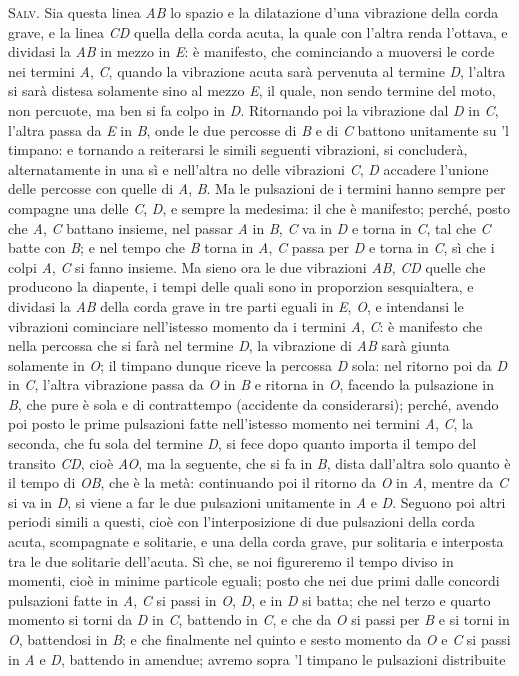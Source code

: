 \documentclass[11pt,twoside,openany]{book}
\newcommand{\speaker}[1]{\textcolor{rubric}{\textsc{#1}}\space}
\begin{document}
\speaker{Salv.} Sia questa linea \emph{AB} lo spazio e la dilatazione d'una vibrazione della corda grave, e la linea \emph{CD} quella della corda acuta, la quale con l'altra renda l'ottava, e dividasi la \emph{AB} in mezzo in \emph{E}: è manifesto, che cominciando a muoversi le corde nei termini \emph{A}, \emph{C}, quando la vibrazione acuta sarà pervenuta al termine \emph{D}, l'altra si sarà distesa solamente sino al mezzo \emph{E}, il quale, non sendo termine del moto, non percuote, ma ben si fa colpo in \emph{D}. Ritornando poi la vibrazione dal \emph{D} in \emph{C}, l'altra passa da \emph{E} in \emph{B}, onde le due percosse di \emph{B} e di \emph{C} battono unitamente su 'l timpano: e tornando a reiterarsi le simili seguenti vibrazioni, si concluderà, alternatamente in una sì e nell'altra no delle vibrazioni \emph{C}, \emph{D} accadere l'unione delle percosse con quelle di \emph{A}, \emph{B}. Ma le pulsazioni de i termini hanno sempre per compagne una delle \emph{C}, \emph{D}, e sempre la medesima: il che è manifesto; perché, posto che \emph{A}, \emph{C} battano insieme, nel passar \emph{A} in \emph{B}, \emph{C} va in \emph{D} e torna in \emph{C}, tal che \emph{C} batte con \emph{B}; e nel tempo che \emph{B} torna in \emph{A}, \emph{C} passa per \emph{D} e torna in \emph{C}, sì che i colpi \emph{A}, \emph{C} si fanno insieme. Ma sieno ora le due vibrazioni \emph{AB}, \emph{CD} quelle che producono la diapente, i tempi delle quali sono in proporzion sesquialtera, e dividasi la \emph{AB} della corda grave in tre parti eguali in \emph{E}, \emph{O}, e intendansi le vibrazioni cominciare nell'istesso momento da i termini \emph{A}, \emph{C}: è manifesto che nella percossa che si farà nel termine \emph{D}, la vibrazione di \emph{AB} sarà giunta solamente in \emph{O}; il timpano dunque riceve la percossa \emph{D} sola: nel ritorno poi da \emph{D} in \emph{C}, l'altra vibrazione passa da \emph{O} in \emph{B} e ritorna in \emph{O}, facendo la pulsazione in \emph{B}, che pure è sola e di contrattempo (accidente da considerarsi); perché, avendo poi posto le prime pulsazioni fatte nell'istesso momento nei termini \emph{A}, \emph{C}, la seconda, che fu sola del termine \emph{D}, si fece dopo quanto importa il tempo del transito \emph{CD}, cioè \emph{AO}, ma la seguente, che si fa in \emph{B}, dista dall'altra solo quanto è il tempo di \emph{OB}, che è la metà: continuando poi il ritorno da \emph{O} in \emph{A}, mentre da \emph{C} si va in \emph{D}, si viene a far le due pulsazioni unitamente in \emph{A} e \emph{D}. Seguono poi altri periodi simili a questi, cioè con l'interposizione di due pulsazioni della corda acuta, scompagnate e solitarie, e una della corda grave, pur solitaria e interposta tra le due solitarie dell'acuta. Sì che, se noi figureremo il tempo diviso in momenti, cioè in minime particole eguali; posto che nei due primi dalle concordi pulsazioni fatte in \emph{A}, \emph{C} si passi in \emph{O}, \emph{D}, e in \emph{D} si batta; che nel terzo e quarto momento si torni da \emph{D} in \emph{C}, battendo in \emph{C}, e che da \emph{O} si passi per \emph{B} e si torni in \emph{O}, battendosi in \emph{B}; e che finalmente nel quinto e sesto momento da \emph{O} e \emph{C} si passi in \emph{A} e \emph{D}, battendo in amendue; avremo sopra 'l timpano le pulsazioni distribuite 
\end{document}
